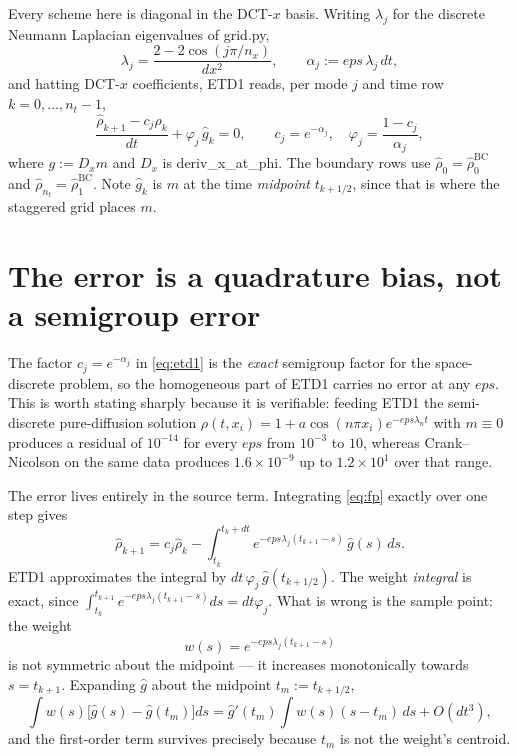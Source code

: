 \documentclass[11pt]{article}
\newcommand{\eps}{\varepsilon}
\newcommand{\dt}{\Delta t}
\newcommand{\dx}{\Delta x}
\newcommand{\code}[1]{\texttt{#1}}
\def\eps{eps}\def\dt{dt}\def\dx{dx}\def\code#1{#1}%
\begin{document}
Every scheme here is diagonal in the DCT-$x$ basis. Writing $\lambda_j$ for the discrete
Neumann Laplacian eigenvalues of \code{grid.py},
\begin{equation}
  \lambda_j = \frac{2-2\cos(j\pi/n_x)}{\dx^2},
  \qquad
  \alpha_j := \eps\,\lambda_j\,\dt ,
  \label{eq:alpha}
\end{equation}
and hatting DCT-$x$ coefficients, ETD1 reads, per mode $j$ and time row
$k=0,\dots,n_t-1$,
\begin{equation}
  \frac{\hat\rho_{k+1} - c_j\hat\rho_k}{\dt} + \varphi_j\,\hat g_k = 0,
  \qquad
  c_j = e^{-\alpha_j},\quad
  \varphi_j = \frac{1-c_j}{\alpha_j},
  \label{eq:etd1}
\end{equation}
where $g := D_xm$ and $D_x$ is \code{deriv\_x\_at\_phi}. The boundary rows use
$\hat\rho_0=\hat\rho_0^{\mathrm{BC}}$ and $\hat\rho_{n_t}=\hat\rho_1^{\mathrm{BC}}$.
Note $\hat g_k$ is $m$ at the time \emph{midpoint} $t_{k+1/2}$, since that is where the
staggered grid places $m$.

\section{The error is a quadrature bias, not a semigroup error}

The factor $c_j=e^{-\alpha_j}$ in \eqref{eq:etd1} is the \emph{exact} semigroup factor
for the space-discrete problem, so the homogeneous part of ETD1 carries no error at any
$\eps$. This is worth stating sharply because it is verifiable: feeding ETD1 the
semi-discrete pure-diffusion solution
$\rho(t,x_i)=1+a\cos(n\pi x_i)e^{-\eps\lambda_nt}$ with $m\equiv0$ produces a residual of
$10^{-14}$ for every $\eps$ from $10^{-3}$ to $10$, whereas Crank--Nicolson on the same
data produces $1.6\times10^{-9}$ up to $1.2\times10^{1}$ over that range.

The error lives entirely in the source term. Integrating \eqref{eq:fp} exactly over one
step gives
\begin{equation}
  \hat\rho_{k+1}
  = c_j\hat\rho_k
  - \int_{t_k}^{t_k+\dt} e^{-\eps\lambda_j(t_{k+1}-s)}\,\hat g(s)\,ds .
  \label{eq:exactstep}
\end{equation}
ETD1 approximates the integral by $\dt\,\varphi_j\,\hat g(t_{k+1/2})$. The weight
\emph{integral} is exact, since
$\int_{t_k}^{t_{k+1}}e^{-\eps\lambda_j(t_{k+1}-s)}ds=\dt\varphi_j$. What is wrong is the
sample point: the weight
\begin{equation}
  w(s) = e^{-\eps\lambda_j(t_{k+1}-s)}
\end{equation}
is not symmetric about the midpoint --- it increases monotonically towards
$s=t_{k+1}$. Expanding $\hat g$ about the midpoint $t_m := t_{k+1/2}$,
\begin{equation}
  \int w(s)\bigl[\hat g(s)-\hat g(t_m)\bigr]ds
  = \hat g'(t_m)\int w(s)(s-t_m)\,ds + O(\dt^3),
\end{equation}
and the first-order term survives precisely because $t_m$ is not the weight's centroid.
\end{document}
